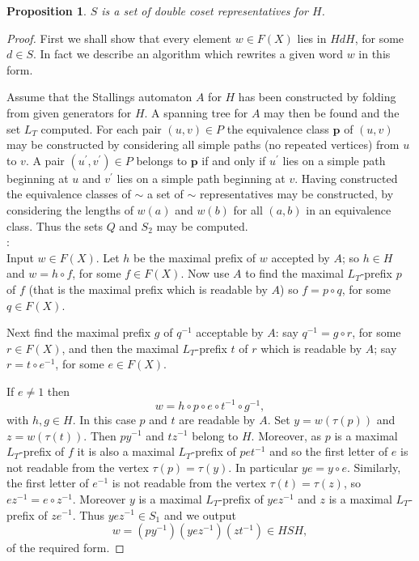 \documentclass[a4paper,12pt]{article}
\def\t{\tau }
\newcommand{\pp}{\mathbf{p}}
\newtheorem{proposition}[theorem]{Proposition}
\numberwithin{equation}{section}
\numberwithin{figure}{section}
\begin{document}
\begin{proposition}\label{prop:dcreps}
$S$ is a set of double coset representatives for $H$.
\end{proposition}   
\begin{proof}
First we shall show that every element $w\in F(X)$ lies in $HdH$, for some $d\in S$. 
In fact we describe an algorithm which rewrites a given word $w$ in this form. 

Assume that the Stallings automaton $A$ for $H$ has been constructed by folding from
given generators for $H$. A spanning tree for $A$ may then be found and the 
set $L_T$ computed. For each pair $(u,v)\in P$ the equivalence class $\pp$ of 
$(u,v)$ may be constructed by considering all simple paths (no repeated vertices)
from $u$ to $v$. A pair $(u^\prime ,v^\prime) \in P$ belongs to $\pp$ if and only
if $u^\prime$ lies on a simple path beginning at $u$ and $v^\prime$ lies on 
a simple path beginning at $v$. Having constructed the equivalence classes of $\sim$
 a set of $\sim$ representatives may be constructed, by considering the 
lengths of $w(a)$ and $w(b)$ for all $(a,b)$ in an equivalence class. Thus the
sets $Q$ and $S_2$ may be computed.   \\

:\\
Input $w\in F(X)$. 
Let $h$ be the maximal prefix of $w$ accepted by $A$; so $h\in H$ and 
$w=h\circ f$, for some $f\in F(X)$. Now use $A$ to find the maximal $L_T$-prefix $p$ 
of $f$ (that is the maximal prefix which is readable by $A$)
 so $f= p\circ q$, for some $q\in F(X)$. 

Next find the maximal prefix $g$ of $q^{-1}$ acceptable by $A$: say 
$q^{-1}=g\circ r$, for some $r\in F(X)$, and then the maximal $L_T$-prefix 
$t$ of $r$ which
is readable by $A$; say $r=t\circ e^{-1}$, for some $e\in F(X)$. 

If $e\neq 1$ then
\[w=h\circ p \circ e\circ t^{-1}\circ g^{-1},\]
with $h,g\in H$. In this case $p$ and $t$ are readable by $A$. Set $y=w(\t(p))$
and $z=w(\t(t))$. Then $py^{-1}$ and $tz^{-1}$ belong to $H$. Moreover, as $p$
is a maximal $L_T$-prefix of $f$ it is also a maximal $L_T$-prefix of $pet^{-1}$ and so
  the 
first letter of $e$ is not readable from the vertex $\t(p)=\t(y)$. In particular
$ye=y\circ e$. Similarly, the first letter of $e^{-1}$ is not readable from
the vertex $\t(t)=\t(z)$, so $ez^{-1}=e\circ z^{-1}$. Moreover $y$ is a 
maximal $L_T$-prefix of $yez^{-1}$ and $z$ is a maximal $L_T$-prefix of $ze^{-1}$. 
Thus $yez^{-1}\in S_1$ and we output
\[w=(py^{-1}) (yez^{-1})(zt^{-1})\in HSH,\]
of the required form.


\end{proof}
\end{document}
